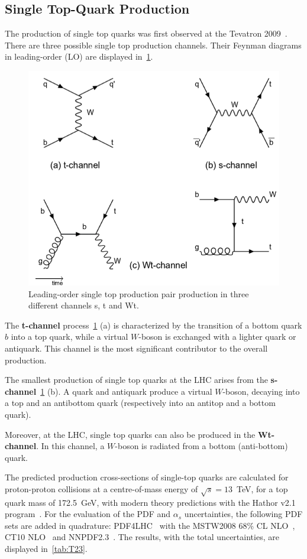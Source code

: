 \subsection{Single Top-Quark Production}
The production of single top quarks was first observed at the Tevatron 2009~\cite{Abazov:2009ii,Aaltonen:2009jj}. There are three possible single top production channels. Their Feynman diagrams in leading-order (LO) are displayed in~\cref{fig:single}.


\begin{figure}[h]
	\centering
	\includegraphics[width=0.5\linewidth]{Pics/cp1/single}
	\caption{Leading-order single top production pair production in three different channels s, t and Wt.} 
	\label{fig:single}
\end{figure}

 The \textbf{t-channel} process~\cref{fig:single} (a) is characterized by the transition of a bottom quark $b$ into a top quark, while a virtual $W$-boson is exchanged with a lighter quark or antiquark. This channel is the most significant contributor to the overall production.

The smallest production of single top quarks at the LHC arises from the \textbf{s-channel}~\cref{fig:single} (b). A quark and antiquark produce a virtual $W$-boson, decaying into a top and an antibottom quark (respectively into an antitop and a bottom quark).

Moreover, at the LHC, single top quarks can also be produced in the \textbf{Wt-channel}. In this channel, a $W$-boson is radiated from a bottom (anti-bottom) quark.

The  predicted production cross-sections of single-top quarks are calculated  for proton-proton collisions at a centre-of-mass energy of $\sqrt{s}=13$~TeV, for a top quark mass of 172.5~GeV, with modern theory predictions with the Hathor v2.1 program~\cite{Aliev:2010zk,Kant:2014oha}. For the evaluation of the PDF and $\alpha_{s}$ uncertainties, the following PDF sets are added in quadrature: PDF4LHC~\cite{Botje:2011sn} with the MSTW2008 68\% CL NLO~\cite{Martin:2009bu,Martin:2009iq}, CT10 NLO~\cite{Lai:2010vv} and NNPDF2.3~\cite{Ball:2012cx}. The results, with the total uncertainties, are displayed in~\cref{tab:T23}.




